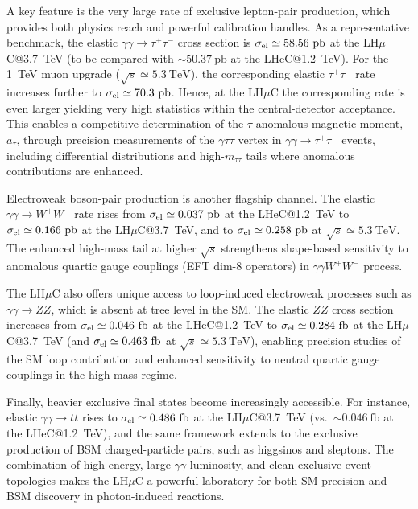 \documentclass[a4paper,11pt]{article}
\begin{document}
A key feature is the very large rate of exclusive lepton-pair production, which provides both physics 
reach and powerful calibration handles. 
As a representative benchmark, the elastic $\gamma\gamma\to\tau^+\tau^-$ cross section is $\sigma_{\rm el}\simeq 58.56~\mathrm{pb}$ at the LH$\mu$C@3.7~TeV (to be compared with $\sim 50.37~\mathrm{pb}$ at the LHeC@1.2~TeV). 
For the 1~TeV muon upgrade ($\sqrt{s}\simeq 5.3~\mathrm{TeV}$), the corresponding elastic $\tau^+\tau^-$ rate 
increases further to $\sigma_{\rm el}\simeq 70.3~\mathrm{pb}$.
Hence, at the LH$\mu$C the corresponding rate is even larger 
yielding very high statistics within the central-detector acceptance.
This enables a competitive determination of the $\tau$ anomalous magnetic moment, $a_\tau$,
through precision measurements of the $\gamma\tau\tau$ vertex in $\gamma\gamma\to\tau^+\tau^-$ events,
including differential distributions and high-$m_{\tau\tau}$ tails where anomalous contributions are enhanced. 


Electroweak boson-pair production is another flagship channel. 
The elastic $\gamma\gamma\to W^+W^-$ rate rises from $\sigma_{\rm el}\simeq 0.037~\mathrm{pb}$ at the LHeC@1.2~TeV to $\sigma_{\rm el}\simeq 0.166~\mathrm{pb}$ at the LH$\mu$C@3.7~TeV, and to $\sigma_{\rm el}\simeq 0.258~\mathrm{pb}$ at $\sqrt{s}\simeq 5.3~\mathrm{TeV}$. 
The enhanced high-mass tail at higher $\sqrt{s}$ strengthens shape-based sensitivity to anomalous quartic gauge couplings (EFT dim-8 operators) in $\gamma\gamma W^+W^-$ process. 

The LH$\mu$C also offers unique access to loop-induced electroweak processes such as $\gamma\gamma\to ZZ$, 
which is absent at tree level in the SM. The elastic $ZZ$ cross section increases 
from $\sigma_{\rm el}\simeq 0.046~\mathrm{fb}$ at the LHeC@1.2~TeV to $\sigma_{\rm el}\simeq 0.284~\mathrm{fb}$ 
at the LH$\mu$C@3.7~TeV (and $\sigma_{\rm el}\simeq 0.463~\mathrm{fb}$ at $\sqrt{s}\simeq 5.3~\mathrm{TeV}$), 
enabling precision studies of the SM loop contribution and enhanced sensitivity to 
neutral quartic gauge couplings in the high-mass regime.

Finally, heavier exclusive final states become increasingly accessible. For instance, 
elastic $\gamma\gamma\to t\bar t$ rises to $\sigma_{\rm el}\simeq 0.486~\mathrm{fb}$ at the LH$\mu$C@3.7~TeV (vs.\ $\sim 0.046~\mathrm{fb}$ at the LHeC@1.2~TeV), and the same framework extends to the exclusive production of BSM 
charged-particle pairs, such as higgsinos and sleptons.
The combination of high energy, large $\gamma\gamma$ luminosity, and clean exclusive event topologies makes the 
LH$\mu$C a powerful laboratory for both SM precision and BSM discovery in photon-induced reactions.
\end{document}
